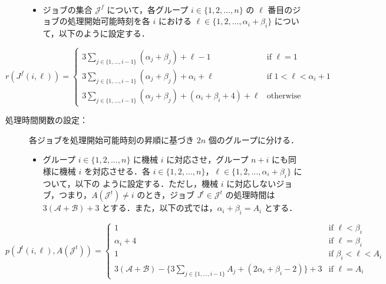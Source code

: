 \documentclass[12pt]{optlab-bachelor}
\begin{document}
\begin{description}
  \item[]~
  \begin{itemize}
    \item ジョブの集合 $\mathcal{J}^f$ について，各グループ $i \in \{1,2,\ldots, n\}$ の $\ell$ 番目のジョブの処理開始可能時刻を各 $i$ における $\ell \in \{1,2,\ldots,\alpha_i + \beta_i\}$ について，以下のように設定する．
  \end{itemize}
\end{description}
\begin{displaymath}
  r(J^f(i,\ell)) =
  \left\{ \begin{array}{lll} 3 \displaystyle \sum_{j \in \{1,\ldots,i
  - 1\}}(\alpha_j + \beta_j) + \ell - 1 & \text{if } \ell = 1
  \\ 3\displaystyle \sum_{j \in \{1,\ldots,i - 1\}}(\alpha_j + \beta_j) + \alpha_i + \ell  &
  \text{if } 1 < \ell < \alpha_i + 1  \\ 3\displaystyle \sum_{j \in \{1,\ldots,i - 1\}}(\alpha_j + \beta_j) + (\alpha_i + \beta_i + 4) + \ell & \text{otherwise} \end{array} \right.
\end{displaymath}
\newpage
\begin{description}
  \item[処理時間関数の設定：] 各ジョブを処理開始可能時刻の昇順に基づき $2n$ 個のグループに分ける．
  \begin{itemize}
    \item グループ $i \in \{1,2,\ldots,n\}$ に機械 $i$ に対応させ，グループ
    $n + i$ にも同様に機械 $i$ を対応させる．各 $i \in \{1,2,\ldots,
    n\}$，$\ell \in \{1,2,\ldots, \alpha_i + \beta_i\}$ について，以下の
    ように設定する．ただし，機械 $i$ に対応しないジョブ，つまり，$A(\mathcal{J}^t)  \neq i$ のとき，ジョブ $J^t \in \mathcal{J}^t$ の処理時間は $3(\mathcal{A} + \mathcal{B}) + 3$ とする．また，以下の式では，$\alpha_i + \beta_i = A_i$ とする．
  \end{itemize}
\end{description}
\begin{displaymath}
  p(J^t(i,\ell), A(\mathcal{J}^t)) =
  \left\{ \begin{array}{llll} 1 & \text{if } \ell < \beta_i\\
  \alpha_i + 4 & \text{if } \ell = \beta_i \\ 1 & \text{if } \beta_i < \ell < A_i \\
  3(\mathcal{A} + \mathcal{B}) - \big\{ 3\!\!\!\!\!\displaystyle \sum_{j \in
  \{1,\ldots,i - 1\}}\!\!\!\!\!A_j + (2\alpha_i +
  \beta_i - 2)\big \} + 3 & \text{if } \ell = A_i \end{array} \right.
\end{displaymath}
\end{document}
